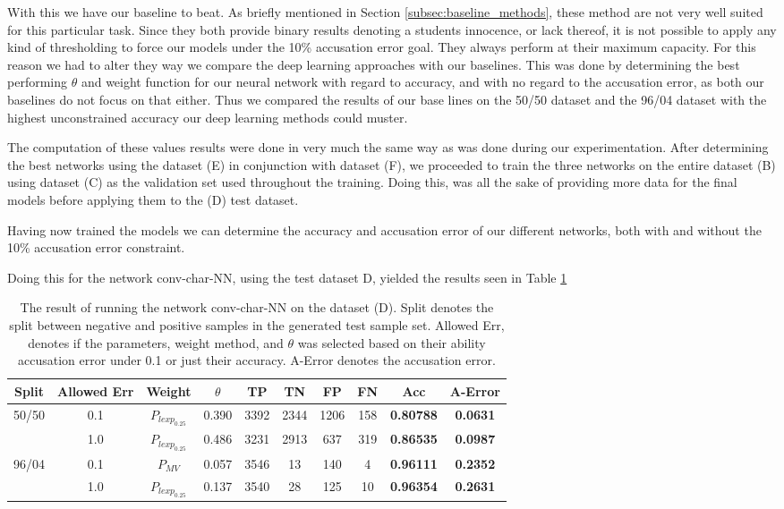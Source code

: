 With this we have our baseline to beat. As briefly mentioned in Section
\ref{subsec:baseline_methods}, these method are not very well suited for this
particular task. Since they both provide binary results denoting a students
innocence, or lack thereof, it is not possible to apply any kind of thresholding
to force our models under the 10\% accusation error goal. They always perform at
their maximum capacity. For this reason we had to alter they way we compare the
deep learning approaches with our baselines. This was done by determining the
best performing $\theta$ and weight function for our neural network with regard
to accuracy, and with no regard to the accusation error, as both our baselines
do not focus on that either. Thus we compared the results of our base lines on
the 50/50 dataset and the 96/04 dataset with the highest unconstrained accuracy
our deep learning methods could muster.

The computation of these values results were done in very much the same way as
was done during our experimentation. After determining the best networks using
the dataset (E) in conjunction with dataset (F), we proceeded to train the three
networks on the entire dataset (B) using dataset (C) as the validation set used
throughout the training. Doing this, was all the sake of providing more
data for the final models before applying them to the (D) test dataset.

Having now trained the models we can determine the accuracy and accusation
error of our different networks, both with and without the 10\% accusation error
constraint.

Doing this for the network \gls{conv-char-NN}, using the test dataset D, yielded
the results seen in Table \ref{tab:char_CNN_res}

\begin{table}[]
\begin{tabular}{|c|c|c|c|c|c|c|c||c|c|}
\hline
Split & Allowed Err & Weight & $\theta$ & TP & TN & FP & FN & \textbf{Acc} & \textbf{A-Error} \\ \hline
\multirow{2}{*}{50/50} & 0.1 & $P_{lexp_{0.25}}$ & 0.390 & 3392 & 2344 & 1206 & 158 & \textbf{0.80788} & \textbf{0.0631} \\ \cline{2-10} 
 & 1.0 & $P_{lexp_{0.25}}$ & 0.486 & 3231 & 2913 & 637 & 319 & \textbf{0.86535} & \textbf{0.0987} \\ \hline
\multirow{2}{*}{96/04} & 0.1 & $P_{MV}$ & 0.057 & 3546 & 13 & 140 & 4 & \textbf{0.96111} & \textbf{0.2352} \\ \cline{2-10} 
 & 1.0 & $P_{lexp_{0.25}}$ & 0.137 & 3540 & 28 & 125 & 10 & \textbf{0.96354} & \textbf{0.2631} \\ \hline
\end{tabular}
\caption{The result of running the network \gls{conv-char-NN} on the dataset
(D). Split denotes the split between negative and positive samples in the
generated test sample set. Allowed Err, denotes if the parameters, weight
method, and $\theta$ was selected based on their ability accusation error under
0.1 or just their accuracy. A-Error denotes the accusation error.}
\label{tab:char_CNN_res}
\end{table}

